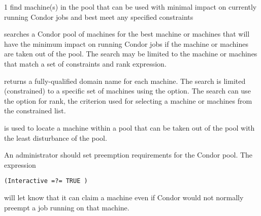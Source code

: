 \begin{ManPage}{\label{man-condor-findhost}}{1}
{find machine(s) in the pool that 
can be used with minimal impact on currently running Condor jobs
and best meet any specified constraints}
\Synopsis {}


\Description

 searches a Condor pool of machines for the
best machine or machines that
will have the minimum impact on running Condor jobs
if the machine or machines are taken out of the pool.
The search may be limited to the machine or machines 
that match a set of constraints and rank expression.

returns a fully-qualified domain name for each machine.
The search is limited (constrained) to a specific set of machines
using the  option.
The search can use the  option for rank,
the criterion used for selecting a machine or machines from the
constrained list.

\begin{Options}
\end{Options}

\GenRem

 is used to locate a machine
within a pool that can be taken out of the pool with the least
disturbance of the pool.

An administrator should set preemption requirements for
the Condor pool.
The expression 
\begin{verbatim}
(Interactive =?= TRUE )
\end{verbatim}
will let  know that it can claim a machine even
if Condor would not normally preempt a job running on that machine.


\end{ManPage}
